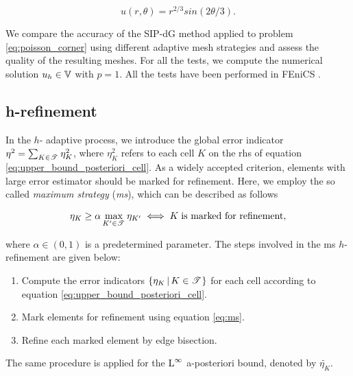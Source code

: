\documentclass[a4paper,11pt]{article}
\begin{document}
{\begin{equation}
    u(r,\theta) = r^{2/3} sin(2\theta/3).
\label{eq:exact_solution_laplace}
\end{equation}

We compare the accuracy of the SIP-dG method applied to problem \eqref{eq:poisson_corner} using different adaptive mesh strategies and assess the quality of the resulting meshes. For all the tests, we compute the numerical solution $u_{h} \in \mathbb V$ with $p=1$. All the tests have been performed in FEniCS \cite{Logg:2010}.

\subsection{h-refinement}

In the $h$- adaptive process, we introduce the global error indicator $\eta^{2} = \sum_{K \in \mathscr T^{}} \eta_{K}^{2}$, where $\eta_{K}^{2}$ refers to each cell $K$ on the rhs of equation \eqref{eq:upper_bound_posteriori_cell}. As a widely accepted criterion, elements with large error estimator should be marked for refinement. Here, we employ the so called \textit{maximum strategy} (\textit{ms}), which can be described as follows

\begin{equation}
    \eta_{K} \geq \alpha \max_{K' \in \mathscr T^{}} \eta_{K'} \iff K \; \text{is marked for refinement},
\label{eq:ms}
\end{equation}

where $\alpha \in (0,1)$ is a predetermined parameter. The steps involved in the ms $h$-refinement are given below:

\begin{enumerate}
    \item Compute the error indicators $\{ \eta_{K} \, | \, K \in \mathscr T^{}  \}$ for each cell according to equation \eqref{eq:upper_bound_posteriori_cell}.

    \item Mark elements for refinement using equation \eqref{eq:ms}.
    
    \item Refine each marked element by edge bisection.
    
\end{enumerate}

The same procedure is applied for the $\operatorname L^{\infty}$ a-posteriori bound, denoted by $\tilde{\eta_{K}}$.    

}
\end{document}
